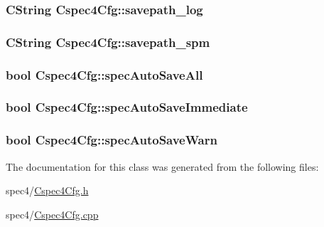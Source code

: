 \label{classCspec4Cfg_a329911703506d86a9013462bdfa65f5b}
\hypertarget{classCspec4Cfg_ada2d4734fa6521d4a24848f4e293e50b}{
\subsubsection[{savepath\_\-log}]{\setlength{\rightskip}{0pt plus 5cm}CString {\bf Cspec4Cfg::savepath\_\-log}}}
\label{classCspec4Cfg_ada2d4734fa6521d4a24848f4e293e50b}
\hypertarget{classCspec4Cfg_a354734f68b96585c094e357aa50d95fb}{
\subsubsection[{savepath\_\-spm}]{\setlength{\rightskip}{0pt plus 5cm}CString {\bf Cspec4Cfg::savepath\_\-spm}}}
\label{classCspec4Cfg_a354734f68b96585c094e357aa50d95fb}
\hypertarget{classCspec4Cfg_a30cf7fbcb0bc7fa56e02954c679041a7}{
\subsubsection[{specAutoSaveAll}]{\setlength{\rightskip}{0pt plus 5cm}bool {\bf Cspec4Cfg::specAutoSaveAll}}}
\label{classCspec4Cfg_a30cf7fbcb0bc7fa56e02954c679041a7}
\hypertarget{classCspec4Cfg_a30eb88c9f2c735022d32afd9cfde560e}{
\subsubsection[{specAutoSaveImmediate}]{\setlength{\rightskip}{0pt plus 5cm}bool {\bf Cspec4Cfg::specAutoSaveImmediate}}}
\label{classCspec4Cfg_a30eb88c9f2c735022d32afd9cfde560e}
\hypertarget{classCspec4Cfg_af2b730cd80963dd674c35d5e58170f86}{
\subsubsection[{specAutoSaveWarn}]{\setlength{\rightskip}{0pt plus 5cm}bool {\bf Cspec4Cfg::specAutoSaveWarn}}}
\label{classCspec4Cfg_af2b730cd80963dd674c35d5e58170f86}


The documentation for this class was generated from the following files:\begin{DoxyCompactItemize}
\item 
spec4/\hyperlink{Cspec4Cfg_8h}{Cspec4Cfg.h}\item 
spec4/\hyperlink{Cspec4Cfg_8cpp}{Cspec4Cfg.cpp}\end{DoxyCompactItemize}
